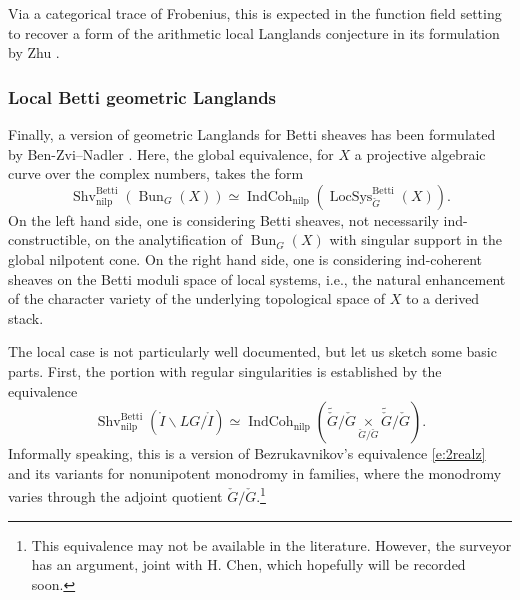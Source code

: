 \documentclass[10pt]{amsart}
\newcommand{\ICn}{\on{IndCoh}_{\on{nilp}}}
\newcommand{\LS}{\on{LocSys}_{\cG}}
\newcommand{\on}{\operatorname}
\theoremstyle{remark}
\newtheorem{re}[subsubsection]{Remark}
\newcommand{\Bun}{\operatorname{Bun}}
\numberwithin{equation}{section}
\newcommand{\cG}{\check{G}}
\begin{document}
	Via a categorical trace of Frobenius, this is expected in the function 
	field setting to recover a form of the  arithmetic local Langlands conjecture in its 
	formulation by Zhu \cite{zhufamilies}. 
	 
	 
	 

	 
	\subsubsection{Local Betti geometric Langlands} Finally, a version of 
	geometric Langlands for Betti sheaves has been formulated by 
	Ben-Zvi--Nadler \cite{benzvinadlerbetti}. 
	Here, the global equivalence, for $X$ a projective algebraic 
	curve over the complex numbers, takes the form 
	\[
	  \on{Shv}^{\on{Betti}}_{\on{nilp}}(\Bun_G(X)) \simeq 
	  \ICn(\LS^{\on{Betti}}(X) ).
	\] 
	On the left hand side, one is considering Betti sheaves, not necessarily 
	ind-constructible, on the analytification of $\Bun_G(X)$ with singular 
	support in the global nilpotent cone. On the right hand 
	side, one is considering ind-coherent sheaves on the Betti moduli space of 
	local systems, i.e., the natural enhancement of the character variety of the 
	underlying topological space of $X$ to a derived stack. 
	
	
	The local case is not particularly well documented, but let us sketch some 
	basic parts.  First, the portion with regular singularities is established 
	by the equivalence
	\begin{equation} \label{e:bezfam}
	      \on{Shv}^{\on{Betti}}_{\on{nilp}}( \mathring{I}\backslash LG / 
	      \mathring{I}) \simeq \ICn( \widetilde{\cG} / \cG \underset {\cG / 
	      \cG} \times \widetilde{\cG} / \cG).
	\end{equation}
	Informally speaking, this is a version of Bezrukavnikov's equivalence 
	\eqref{e:2realz} and its variants for nonunipotent monodromy in families, where the monodromy varies through the adjoint quotient $\check{G} / \check{G}$.\footnote{This equivalence may not be available in the literature. However, the surveyor has an argument, joint with H. Chen, which hopefully will be recorded soon.}
	
\end{document}
